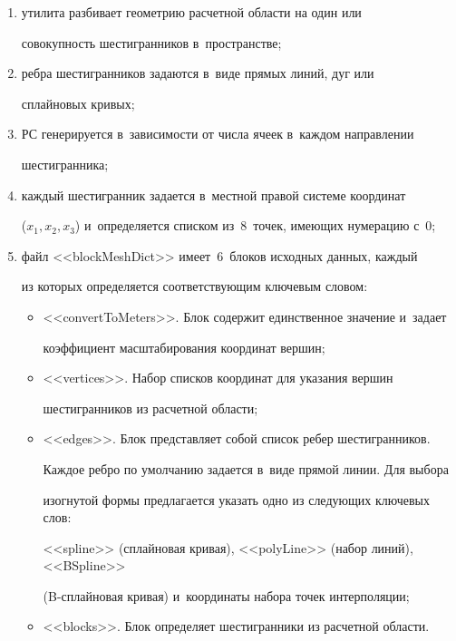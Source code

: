   \begin{enumerate}[(1)]


\item утилита разбивает геометрию расчетной области на один или 


совокупность шестигранников в~пространстве;


\item ребра шестигранников задаются в~виде прямых линий, дуг или 


сплайновых кривых;


\item РС генерируется в~зависимости от числа ячеек в~каждом направлении 


шестигранника;


\item каждый шестигранник задается в~местной правой системе координат 


($x_1, x_2, x_3$) и~определяется списком из~8~точек, имеющих нумерацию с~0;


\item файл <<blockMeshDict>> имеет~6~блоков исходных данных, каждый 


из которых определяется соответствующим ключевым словом:


\begin{itemize}


\item <<convertToMeters>>. Блок содержит единственное значение и~задает 


коэффициент масштабирования координат вершин;


\item <<vertices>>. Набор списков координат для указания вершин 


шестигранников из расчетной области;


\item <<edges>>. Блок представляет собой список ребер шестигранников. 


Каж\-дое ребро по умолчанию задается в~виде прямой линии. Для выбора\linebreak 


изогнутой формы предлагается указать одно из следующих ключевых слов: 


<<spline>> (сплайновая кривая), <<polyLine>> (набор линий), <<BSpline>> 


(B-сплай\-но\-вая кривая) и~координаты набора точек интерполяции;


\item <<blocks>>. Блок определяет шестигранники из расчетной об\-ласти. 



\end{itemize}
\end{enumerate}

